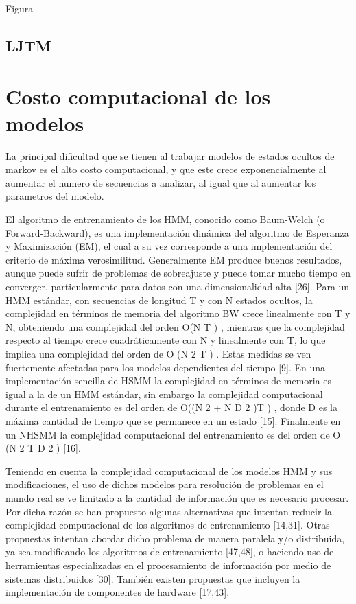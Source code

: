 Figura




\subsection{LJTM}



\section{Costo computacional de los modelos} %
\label{section3.2}


La principal dificultad que se tienen al trabajar modelos de estados ocultos de markov es el alto costo computacional, y que este crece exponencialmente al aumentar el numero de secuencias a analizar, al igual que al aumentar los parametros del modelo. 

El algoritmo de entrenamiento de los HMM, conocido como Baum-Welch (o Forward-Backward), es una implementación dinámica del algoritmo de Esperanza y Maximización (EM), el cual a su vez corresponde a una implementación del criterio de máxima verosimilitud. Generalmente EM produce buenos resultados, aunque puede sufrir de problemas de sobreajuste y puede tomar mucho tiempo en converger, particularmente para datos con una dimensionalidad alta [26]. Para un HMM estándar, con secuencias de longitud T y con N estados ocultos, la complejidad en términos de memoria del algoritmo BW crece linealmente con T y N, obteniendo una complejidad del orden O(N T ) , mientras que la complejidad respecto al tiempo crece cuadráticamente con N y linealmente con T, lo que implica una complejidad del orden de O (N 2 T ) . Estas medidas se ven fuertemente afectadas para los modelos dependientes del tiempo [9]. En una implementación sencilla de HSMM la complejidad en términos de memoria es igual a la de un HMM estándar, sin embargo la complejidad computacional durante el entrenamiento es del orden de O((N 2 + N D 2 )T ) , donde D es la máxima cantidad de tiempo que se permanece en un estado [15]. Finalmente en un NHSMM la complejidad computacional del entrenamiento es del orden de O (N 2 T D 2 ) [16].

Teniendo en cuenta la complejidad computacional de los modelos HMM y sus modificaciones, el uso de dichos modelos para resolución de problemas en el mundo real se ve limitado a la cantidad de información que es necesario procesar. Por dicha razón se han propuesto algunas alternativas que intentan reducir la complejidad computacional de los algoritmos de entrenamiento [14,31]. Otras propuestas intentan abordar dicho problema de manera paralela y/o distribuida, ya sea modificando los algoritmos de entrenamiento [47,48], o haciendo uso de herramientas especializadas en el procesamiento de información por medio de sistemas distribuidos [30]. También existen propuestas que incluyen la implementación de componentes de hardware [17,43].

